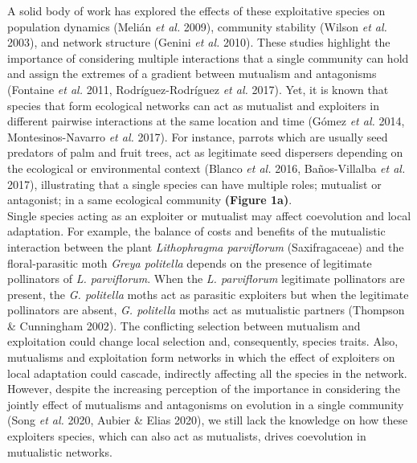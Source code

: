 \documentclass[a4paper, 12pt]{article}
\begin{document}
A solid body of work has explored the effects of these exploitative species on population dynamics (Melián \textit{et al.} 2009), community stability (Wilson \textit{et al.} 2003), and network structure (Genini \textit{et al.} 2010). These studies highlight the importance of considering multiple interactions that a single community can hold and assign the extremes of a gradient between mutualism and antagonisms (Fontaine \textit{et al.} 2011, Rodríguez-Rodríguez \textit{et al.} 2017). Yet, it is known that species that form ecological networks can act as mutualist and exploiters in different pairwise interactions at the same location and time (Gómez \textit{et al.} 2014, Montesinos-Navarro \textit{et al.} 2017). For instance, parrots which are usually seed predators of palm and fruit trees, act as legitimate seed dispersers depending on the ecological or environmental context (Blanco \textit{et al.} 2016, Baños-Villalba \textit{et al.} 2017), illustrating that a single species can have multiple roles; mutualist or antagonist; in a same ecological community \textbf{(Figure 1a)}.\\
Single species acting as an exploiter or mutualist may affect coevolution and local adaptation. For example, the balance of costs and benefits of the mutualistic interaction between the plant \textit{Lithophragma parviflorum} (Saxifragaceae) and the floral-parasitic moth \textit{Greya politella} depends on the presence of legitimate pollinators of \textit{L. parviflorum}. When the \textit{L. parviflorum} legitimate pollinators are present, the \textit{G. politella} moths act as parasitic exploiters but when the legitimate pollinators are absent, \textit{G. politella} moths act as mutualistic partners (Thompson \& Cunningham 2002). The conflicting selection between mutualism and exploitation could change local selection and, consequently, species traits. Also, mutualisms and exploitation form networks in which the effect of exploiters on local adaptation could cascade, indirectly affecting all the species in the network. However, despite the increasing perception of the importance in considering the jointly effect of mutualisms and antagonisms on evolution in a single community (Song \textit{et al.} 2020, Aubier \& Elias 2020), we still lack the knowledge on how these exploiters species, which can also act as mutualists, drives coevolution in mutualistic networks.\\
\end{document}
